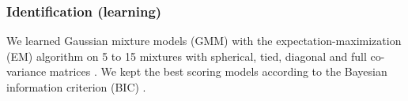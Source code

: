 \subsubsection{Identification (learning)}
We learned Gaussian mixture models (GMM) with the expectation-maximization (EM) algorithm on 5 to 15 mixtures with spherical, tied, diagonal and full co-variance matrices \citep{scikit-learn}. We kept the best scoring models according to the Bayesian information criterion (BIC) \citep{schwarz1978}. %


